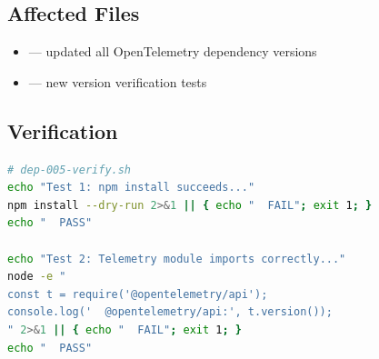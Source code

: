 \subsection*{Affected Files}
\begin{itemize}
    \item {} --- updated all OpenTelemetry dependency versions
    \item {} --- new version verification tests
\end{itemize}

\subsection*{Verification}
\begin{lstlisting}[language=bash]
# dep-005-verify.sh
echo "Test 1: npm install succeeds..."
npm install --dry-run 2>&1 || { echo "  FAIL"; exit 1; }
echo "  PASS"

echo "Test 2: Telemetry module imports correctly..."
node -e "
const t = require('@opentelemetry/api');
console.log('  @opentelemetry/api:', t.version());
" 2>&1 || { echo "  FAIL"; exit 1; }
echo "  PASS"
\end{lstlisting}
